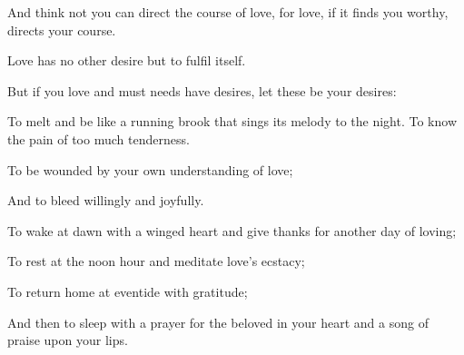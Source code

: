 And think not you can direct the course
of love, for love, if it finds you
worthy, directs your course.

Love has no other desire but to fulfil
itself.

But if you love and must needs have
desires, let these be your desires:

To melt and be like a running brook that
sings its melody to the night. To
know the pain of too much tenderness.

To be wounded by your own understanding
of love;

And to bleed willingly and joyfully.

To wake at dawn with a winged heart and
give thanks for another day of loving;

To rest at the noon hour and meditate
love’s ecstacy;

To return home at eventide with
gratitude;

And then to sleep with a prayer for
the beloved in your heart and a song of
praise upon your lips.
